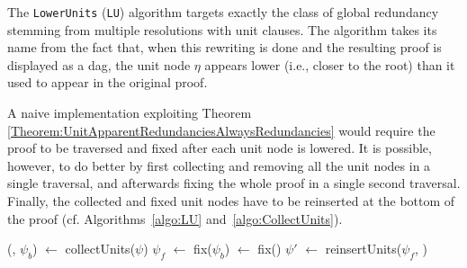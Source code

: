 \documentclass[envcountsame]{llncs}
\newcommand{\LUlong}{\texttt{Lower\-Units}}
\newcommand{\LU}{\texttt{\upshape LU}}
\begin{document}
The {\LUlong} ({\LU}) algorithm targets exactly the class of global redundancy
stemming from multiple resolutions with unit clauses.
The algorithm takes its name from the fact that, when this rewriting is done and
the resulting proof is displayed as a dag, the unit node $\eta$ appears lower
(i.e., closer to the root) than it used to appear in the original proof.

A naive implementation exploiting Theorem
\ref{Theorem:UnitApparentRedundanciesAlwaysRedundancies} would require the proof
to be traversed and fixed after each unit node is lowered. It is possible,
however, to do better by first collecting and removing all the unit nodes in a
single traversal, and afterwards fixing the whole proof in a single second
traversal. Finally, the collected and fixed unit nodes have to be reinserted at
the bottom of the proof (cf. Algorithms~\ref{algo:LU} and~\ref{algo:CollectUnits}).



\newcommand{\la}{\leftarrow}


\linesnumbered
\begin{algorithm}[b]
\caption{\label{algo:LU} \LUlong}
\begin{footnotesize}
\SetLine
{}


\BlankLine

(\units, $\psi_b$) $\la$ collectUnits($\psi$)\;
$\psi_f$ $\la$ fix($\psi_b$)\;
\fixedUnits $\la$ fix(\units)\;
$\psi'$ $\la$ reinsertUnits($\psi_f$, \fixedUnits) \;
\;
\end{footnotesize}
\end{algorithm}

\end{document}
